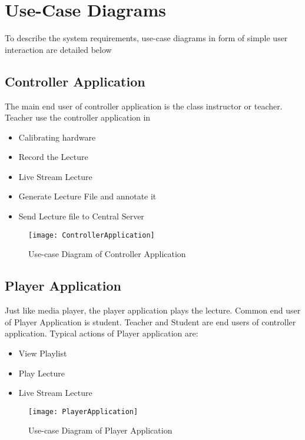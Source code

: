 \newpage
\section{Use-Case Diagrams}
To describe the system requirements, use-case diagrams in form of simple user interaction are detailed below
\subsection{Controller Application}
The main end user of controller application is the class instructor or teacher. Teacher use the controller application in
\begin{itemize}

\item Calibrating hardware
\item Record the Lecture
\item Live Stream Lecture
\item Generate Lecture File and annotate it
\item Send Lecture file to Central Server


\end{itemize}

\begin{figure}[h]
  \centering
  \texttt{[image: ControllerApplication]}
  \caption{Use-case Diagram of Controller Application}
\end{figure}

\newpage

\subsection{Player Application}
Just like media player, the player application plays the lecture. Common end user of Player Application is student. Teacher and Student are end users of controller application. Typical actions of Player application are:

\begin{itemize}

\item View Playlist
\item Play Lecture
\item Live Stream Lecture


\end{itemize}

\bigskip

\begin{figure}[h]
  \centering
  \texttt{[image: PlayerApplication]}
  \caption{Use-case Diagram of Player Application}
\end{figure}

